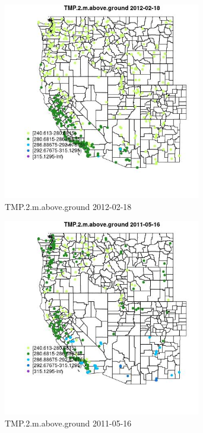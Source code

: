 \begin{figure} 
\centering  
\includegraphics[width=0.77\textwidth]{Code_Outputs/Report_ML_input_PM25_Step4_part_f_de_duplicated_aveswNAs_MapObsTMP2maboveground2012-02-18.jpg} 
\caption{\label{fig:Report_ML_input_PM25_Step4_part_f_de_duplicated_aveswNAsMapObsTMP2maboveground2012-02-18}TMP.2.m.above.ground 2012-02-18} 
\end{figure} 
 

\clearpage 

\begin{figure} 
\centering  
\includegraphics[width=0.77\textwidth]{Code_Outputs/Report_ML_input_PM25_Step4_part_f_de_duplicated_aveswNAs_MapObsTMP2maboveground2011-05-16.jpg} 
\caption{\label{fig:Report_ML_input_PM25_Step4_part_f_de_duplicated_aveswNAsMapObsTMP2maboveground2011-05-16}TMP.2.m.above.ground 2011-05-16} 
\end{figure} 
 

